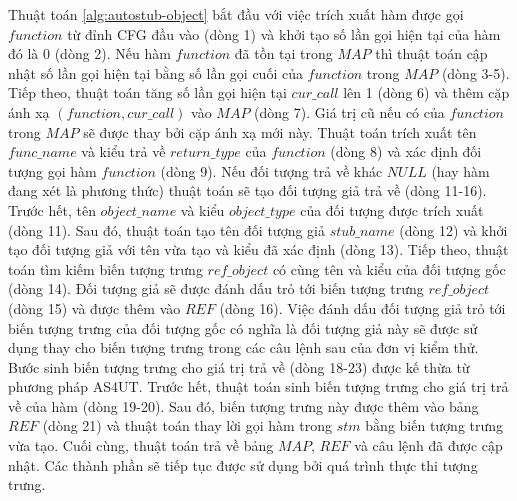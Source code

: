 Thuật toán \ref{alg:autostub-object} bắt đầu với việc trích xuất hàm được gọi $function$ từ đỉnh CFG đầu vào (dòng 1) và khởi tạo số lần gọi hiện tại của hàm đó là 0 (dòng 2). Nếu hàm $function$ đã tồn tại trong $MAP$ thì thuật toán cập nhật số lần gọi hiện tại bằng số lần gọi cuối của $function$ trong $MAP$ (dòng 3-5). Tiếp theo, thuật toán tăng số lần gọi hiện tại $cur\_call$ lên 1 (dòng 6) và thêm cặp ánh xạ $(function, cur\_call)$ vào $MAP$ (dòng 7). Giá trị cũ nếu có của $function$ trong $MAP$ sẽ được thay bởi cặp ánh xạ mới này. Thuật toán trích xuất tên $func\_name$ và kiểu trả về $return\_type$ của $function$ (dòng 8) và xác định đối tượng gọi hàm $function$ (dòng 9). Nếu đối tượng trả về khác $NULL$ (hay hàm đang xét là phương thức) thuật toán sẽ tạo đối tượng giả trả về (dòng 11-16). Trước hết, tên $object\_name$ và kiểu $object\_type$ của đối tượng được trích xuất (dòng 11). Sau đó, thuật toán tạo tên đối tượng giả $stub\_name$ (dòng 12) và khởi tạo đối tượng giả với tên vừa tạo và kiểu đã xác định (dòng 13). Tiếp theo, thuật toán tìm kiếm biến tượng trưng $ref\_object$ có cùng tên và kiểu của đối tượng gốc (dòng 14). Đối tượng giả sẽ được đánh dấu trỏ tới biến tượng trưng $ref\_object$ (dòng 15) và được thêm vào $REF$ (dòng 16). Việc đánh dấu đối tượng giả trỏ tới biến tượng trưng của đối tượng gốc có nghĩa là đối tượng giả này sẽ được sử dụng thay cho biến tượng trưng trong các câu lệnh sau của đơn vị kiểm thử. Bước sinh biến tượng trưng cho giá trị trả về (dòng 18-23) được kế thừa từ phương pháp AS4UT. Trước hết, thuật toán sinh biến tượng trưng cho giá trị trả về của hàm (dòng 19-20). Sau đó, biến tượng trưng này được thêm vào bảng $REF$ (dòng 21) và thuật toán thay lời gọi hàm trong $stm$ bằng biến tượng trưng vừa tạo. Cuối cùng, thuật toán trả về bảng $MAP$, $REF$ và câu lệnh đã được cập nhật. Các thành phần sẽ tiếp tục được sử dụng bởi quá trình thực thi tượng trưng.  

